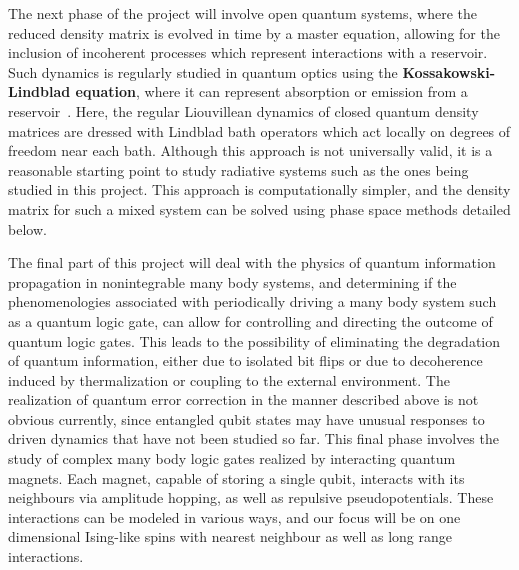 \documentclass[a4paper,11pt,color]{article}
\begin{document}
The next phase of the project will involve  open quantum systems, where the reduced density matrix is evolved in time by a master equation, allowing for the inclusion of incoherent processes which represent interactions with a reservoir. Such dynamics is regularly studied in quantum optics using the \textbf{Kossakowski-Lindblad equation}, where it can represent absorption or emission from a reservoir~\cite{lindblad}. Here, the regular Liouvillean dynamics of closed quantum density matrices are dressed with Lindblad bath operators which act locally on degrees of freedom near each bath. Although this approach is not universally valid, it is a reasonable starting point to study radiative systems such as the ones being studied in this project.  This approach is computationally simpler, and the density matrix for such a mixed system can be solved using phase space methods detailed below.

The final part of this project will deal with the physics of quantum information propagation in nonintegrable many body systems, and determining if the phenomenologies associated with periodically driving a many body system such as a quantum logic gate, can allow for
controlling and directing the outcome of quantum logic gates. This leads to the possibility of eliminating the degradation of quantum information, either due to isolated bit flips or due to decoherence induced by thermalization or coupling to the external environment.  The realization of quantum error correction in the manner described above is not obvious currently, since entangled qubit states may have unusual responses to driven dynamics that have not been studied so far. This final phase  involves the study of complex many body logic gates realized by interacting quantum magnets. Each magnet, capable of storing a single qubit, interacts with its neighbours via amplitude hopping, as well as repulsive pseudopotentials. These interactions can be modeled in various ways, and our focus will be on one dimensional Ising-like spins with nearest neighbour as well as long range interactions. 
\end{document}
